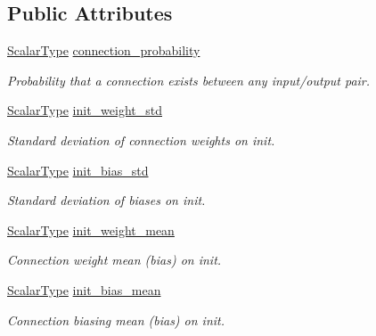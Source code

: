 \subsection*{Public Attributes}
\begin{DoxyCompactItemize}
\item 
\hyperlink{classffnn_1_1layer_1_1internal_1_1_interface_a7f834e3365e5199bcbcd16d9abd63941}{Scalar\-Type} \hyperlink{structffnn_1_1layer_1_1_sparsely_connected_1_1_parameters_a39f70b139f89889bd9922b0f1e3e1a08}{connection\-\_\-probability}
\begin{DoxyCompactList}\small\item\em Probability that a connection exists between any input/output pair. \end{DoxyCompactList}\item 
\hyperlink{classffnn_1_1layer_1_1internal_1_1_interface_a7f834e3365e5199bcbcd16d9abd63941}{Scalar\-Type} \hyperlink{structffnn_1_1layer_1_1_sparsely_connected_1_1_parameters_a53c73023fc8eed25b729108ecaa6b02a}{init\-\_\-weight\-\_\-std}
\begin{DoxyCompactList}\small\item\em Standard deviation of connection weights on init. \end{DoxyCompactList}\item 
\hyperlink{classffnn_1_1layer_1_1internal_1_1_interface_a7f834e3365e5199bcbcd16d9abd63941}{Scalar\-Type} \hyperlink{structffnn_1_1layer_1_1_sparsely_connected_1_1_parameters_a7ff5cde21ad93390fcd0a608abf2b474}{init\-\_\-bias\-\_\-std}
\begin{DoxyCompactList}\small\item\em Standard deviation of biases on init. \end{DoxyCompactList}\item 
\hyperlink{classffnn_1_1layer_1_1internal_1_1_interface_a7f834e3365e5199bcbcd16d9abd63941}{Scalar\-Type} \hyperlink{structffnn_1_1layer_1_1_sparsely_connected_1_1_parameters_a685b96c3c0008391828a257686c22b9a}{init\-\_\-weight\-\_\-mean}
\begin{DoxyCompactList}\small\item\em Connection weight mean (bias) on init. \end{DoxyCompactList}\item 
\hyperlink{classffnn_1_1layer_1_1internal_1_1_interface_a7f834e3365e5199bcbcd16d9abd63941}{Scalar\-Type} \hyperlink{structffnn_1_1layer_1_1_sparsely_connected_1_1_parameters_ae2de00161c3080f10b1213fd296907b1}{init\-\_\-bias\-\_\-mean}
\begin{DoxyCompactList}\small\item\em Connection biasing mean (bias) on init. \end{DoxyCompactList}\end{DoxyCompactItemize}


